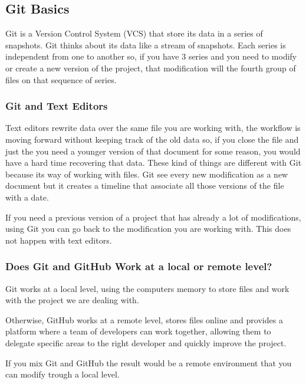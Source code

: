 \documentclass{article}
\begin{document}
    \subsection{Git Basics}
    
    Git is a Version Control System (VCS) that store its data in a series of snapshots. Git thinks about its data like a stream of snapshots. Each series is independent from one to another so, if you have 3 series and you need to modify or create a new version of the project, that modification will the fourth group of files on that sequence of series. \par
    
    \subsubsection{Git and Text Editors}
	
	
	Text editors rewrite data over the same file you are working with, the workflow is moving forward without keeping track of the old data so, if you close the file and just the you need a younger version of that document for some reason, you would have a hard time recovering that data. These kind of things are different with Git because its way of working with files. Git see every new modification as a new document but it creates a timeline that associate all those versions of the file with a date.\par
	
	If you need a previous version of a project that has already a lot of modifications, using Git you can go back to the modification you are working with. This does not happen with text editors.
	
	\subsubsection{Does Git and GitHub Work at a local or remote level?}
	
	Git works at a local level, using the computers memory to store files and work with the project we are dealing with.\par
	
	Otherwise, GitHub works at a remote level, stores files online and provides a platform where a team of developers can work together, allowing them to delegate specific areas to the right developer and quickly improve the project.\par

    If you mix Git and GitHub the result would be a remote environment that you can modify trough a local level.
    
\end{document}
